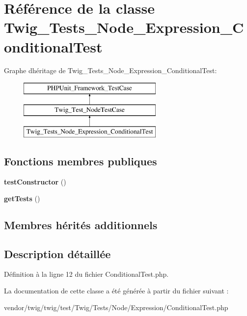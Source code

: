 \hypertarget{class_twig___tests___node___expression___conditional_test}{}\section{Référence de la classe Twig\+\_\+\+Tests\+\_\+\+Node\+\_\+\+Expression\+\_\+\+Conditional\+Test}
\label{class_twig___tests___node___expression___conditional_test}
Graphe d\textquotesingle{}héritage de Twig\+\_\+\+Tests\+\_\+\+Node\+\_\+\+Expression\+\_\+\+Conditional\+Test\+:\begin{figure}[H]
\begin{center}
\leavevmode
\includegraphics[height=3.000000cm]{class_twig___tests___node___expression___conditional_test}
\end{center}
\end{figure}
\subsection*{Fonctions membres publiques}
\begin{DoxyCompactItemize}
\item 
{\bfseries test\+Constructor} ()\hypertarget{class_twig___tests___node___expression___conditional_test_a47094dc941e72950570900d1418f89c6}{}\label{class_twig___tests___node___expression___conditional_test_a47094dc941e72950570900d1418f89c6}

\item 
{\bfseries get\+Tests} ()\hypertarget{class_twig___tests___node___expression___conditional_test_a7e247dd31cc8d37a6c97353a062a0080}{}\label{class_twig___tests___node___expression___conditional_test_a7e247dd31cc8d37a6c97353a062a0080}

\end{DoxyCompactItemize}
\subsection*{Membres hérités additionnels}


\subsection{Description détaillée}


Définition à la ligne 12 du fichier Conditional\+Test.\+php.



La documentation de cette classe a été générée à partir du fichier suivant \+:\begin{DoxyCompactItemize}
\item 
vendor/twig/twig/test/\+Twig/\+Tests/\+Node/\+Expression/Conditional\+Test.\+php\end{DoxyCompactItemize}
